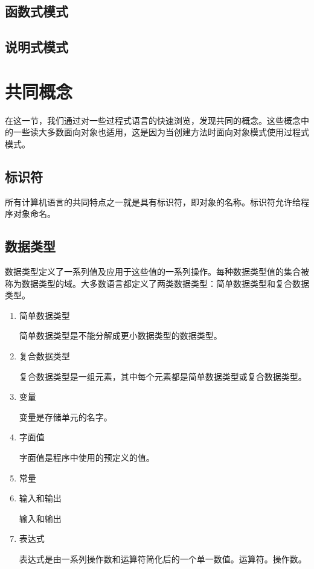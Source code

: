 \subsection{函数式模式}
\subsection{说明式模式}
\section{共同概念}
在这一节，我们通过对一些过程式语言的快速浏览，发现共同的概念。这些概念中的一些读大多数面向对象也适用，这是因为当创建方法时面向对象模式使用过程式模式。
\subsection{标识符}
所有计算机语言的共同特点之一就是具有标识符，即对象的名称。标识符允许给程序对象命名。
\subsection{数据类型}
数据类型定义了一系列值及应用于这些值的一系列操作。每种数据类型值的集合被称为数据类型的域。大多数语言都定义了两类数据类型：简单数据类型和复合数据类型。
\begin{enumerate}
	\item 简单数据类型

	简单数据类型是不能分解成更小数据类型的数据类型。

	\item 复合数据类型

	复合数据类型是一组元素，其中每个元素都是简单数据类型或复合数据类型。
	
	\item 变量

	变量是存储单元的名字。
	\item 字面值

	字面值是程序中使用的预定义的值。
	\item 常量

	\item 输入和输出

	输入和输出
	\item 表达式

	表达式是由一系列操作数和运算符简化后的一个单一数值。运算符。操作数。
\end{enumerate}
